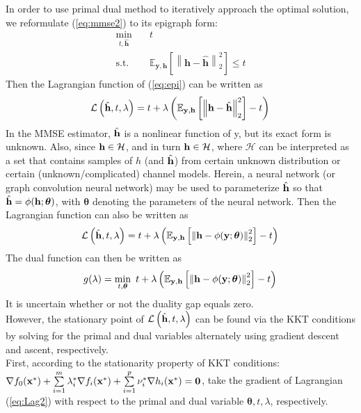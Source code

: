 \documentclass[a4paper, onecolumn, 11pt]{IEEEtran}
\begin{document}
        In order to use primal dual method to iteratively approach the optimal solution, we reformulate (\ref{eq:mmse2}) to its epigraph form:
        \begin{equation}
        \begin{aligned} \label{eq:epi}
            \min_{t,\hat{\mathbf{h}}} \quad & t \\
            \text{s.t.} \quad & \mathbb{E}_{\mathbf{y},\mathbf{h}}\left[\left\| \mathbf{h}-\hat{\mathbf{h}} \right\|^2_2\right] \leq t
        \end{aligned}
        \end{equation}
        Then the Lagrangian function of (\ref{eq:epi}) can be written as
        \begin{equation} \label{eq:Lag1}
            \mathcal{L} \left(\hat{{\bf h}},t,\lambda\right) = t + \lambda\left(\mathbb{E}_{{\bf y},{\bf h}}\left[\left\| {\bf h}-\hat{{\bf h}} \right\|^2_2 \right] -t \right)\\
        \end{equation}
        In the MMSE estimator, $\hat{{\bf h}}$ is a nonlinear function of y, but its exact form is unknown. Also, since ${\bf h} \in \mathcal{H} $, 
        and in turn ${\bf h} \in \mathcal{H} $, where $\mathcal{H}$ can be interpreted as a set that contains samples of $h$ (and $\hat{{\bf h}}$) from certain 
        unknown distribution or certain (unknown/complicated) channel models. Herein, a neural network (or graph convolution neural network) may be used to
        parameterize $\hat{{\bf h}}$ so that $\hat{{\bf h}}=\phi({\bf h};\boldsymbol{\theta})$, with $\boldsymbol{\theta}$ denoting the parameters of the neural network.
        Then the Lagrangian function can also be written as
        \begin{equation} \label{eq:Lag2}
            \mathcal{L} \left(\hat{{\bf h}},t,\lambda\right) = t + \lambda\left(\mathbb{E}_{{\bf y},{\bf h}}\left[\left\| {\bf h}-\phi(\mathbf{y};\boldsymbol{\theta}) \right\|^2_2 \right] -t \right)\\
        \end{equation}
        The dual function can then be written as
        \begin{equation} \label{eq:dual}
            g(\lambda) = \min_{t,\boldsymbol{\theta}}~ t + \lambda\left(\mathbb{E}_{{\bf y},{\bf h}}\left[\left\| {\bf h}-\phi(\mathbf{y};\boldsymbol{\theta}) \right\|^2_2 \right] -t \right)\\
        \end{equation}
        It is uncertain whether or not the duality gap equals zero.\\
        However, the stationary point of $  \mathcal{L} \left(\hat{{\bf h}},t,\lambda\right)$ can be found via the KKT conditions by solving for the primal and dual
        variables alternately using gradient descent and ascent, respectively.\\
        First, according to the stationarity property of KKT conditions:
        $\nabla f_0({\bf x}^*) + \sum\limits_{i=1}^{m}\lambda_i^*\nabla f_i({\bf x}^*) + \sum\limits_{i=1}^{p}\nu_i^*\nabla h_i({\bf x}^*) = {\bf 0}$,
        take the gradient of Lagrangian (\ref{eq:Lag2}) with respect to the primal and dual variable $\boldsymbol{\theta}, t, \lambda$, respectively.
        
\end{document}
